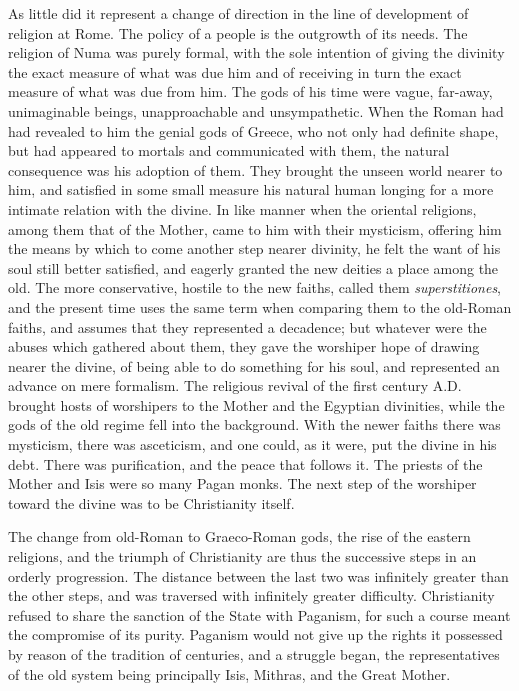 \documentclass[a4paper, 11pt, oneside, polutonikogreek, english]{article}
\begin{document}
As little did it represent a change of direction in the line of development of religion at Rome. The policy of a people is the outgrowth of its needs. The religion of Numa was purely formal, with the sole intention of giving the divinity the exact measure of what was due him and of receiving in turn the exact measure of what was due from him. The gods of his time were vague, far-away, unimaginable beings, unapproachable and unsympathetic. When the Roman had had revealed to him the genial gods of Greece, who not only had definite shape, but had appeared to mortals and communicated with them, the natural consequence was his adoption of them. They brought the unseen world nearer to him, and satisfied in some small measure his natural human longing for a more intimate relation with the divine. In like manner when the oriental religions, among them that of the Mother, came to him with their mysticism, offering him the means by which to come another step nearer divinity, he felt the want of his soul still better satisfied, and eagerly granted the new deities a place among the old. The more conservative, hostile to the new faiths, called them \emph{superstitiones}, and the present time uses the same term when comparing them to the old-Roman faiths, and assumes that they represented a decadence; but whatever were the abuses which gathered about them, they gave the worshiper hope of drawing nearer the divine, of being able to do something for his soul, and represented an advance on mere formalism. The religious revival of the first century \textsc{A.D.} brought hosts of worshipers to the Mother and the Egyptian divinities, while the gods of the old regime fell into the background. With the newer faiths there was mysticism, there was asceticism, and one could, as it were, put the divine in his debt. There was purification, and the peace that follows it. The priests of the Mother and Isis were so many Pagan monks. The next step of the worshiper toward the divine was to be Christianity itself.

The change from old-Roman to Graeco-Roman gods, the rise of the eastern religions, and the triumph of Christianity are thus the successive steps in an orderly progression. The distance between the last two was infinitely greater than the other steps, and was traversed with infinitely greater difficulty. Christianity refused to share the sanction of the State with Paganism, for such a course meant the compromise of its purity. Paganism would not give up the rights it possessed by reason of the tradition of centuries, and a struggle began, the representatives of the old system being principally Isis, Mithras, and the Great Mother.
\end{document}
